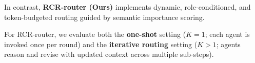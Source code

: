 \documentclass[letterpaper]{article} %
\begin{document}
In contrast, \textbf{RCR-router (Ours)} implements dynamic, role-conditioned, and token-budgeted routing guided by semantic importance scoring. %



For RCR-router, we evaluate both the \textbf{one-shot} setting ($K=1$; each agent is invoked once per round) and the \textbf{iterative routing} setting ($K > 1$; agents reason and revise with updated context across multiple sub-steps).

\end{document}
